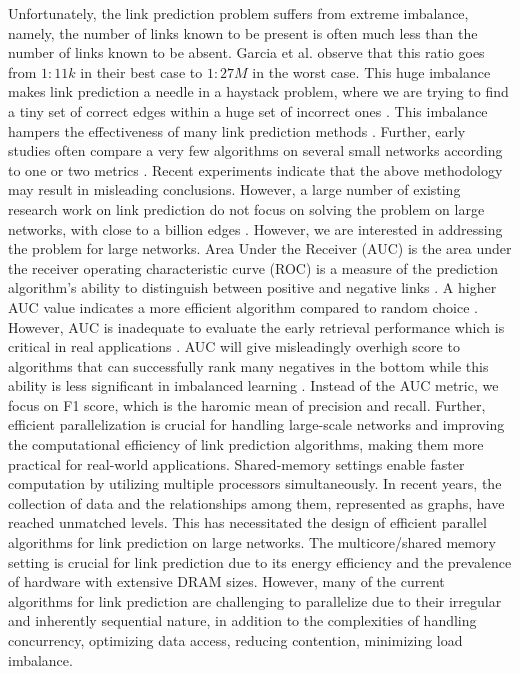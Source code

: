 Unfortunately, the link prediction problem suffers from extreme imbalance, namely, the number of links known to be present is often much less than the number of links known to be absent. Garcia et al. \cite{garcia2014link} observe that this ratio goes from $1 : 11k$ in their best case to $1 : 27M$ in the worst case. This huge imbalance makes link prediction a needle in a haystack problem, where we are trying to find a tiny set of correct edges within a huge set of incorrect ones \cite{garcia2014link, wang2014link}. This imbalance hampers the effectiveness of many link prediction methods \cite{wang2014link}. Further, early studies often compare a very few algorithms on several small networks according to one or two metrics \cite{zhou2021progresses}. Recent experiments \cite{mara2020benchmarking, ghasemian2020stacking, muscoloni2022adaptive, zhou2021experimental} indicate that the above methodology may result in misleading conclusions. However, a large number of existing research work on link prediction do not focus on solving the problem on large networks, with close to a billion edges \cite{muscoloni2022adaptive, mumin2022efficient, nasiri2021novel, xian2021towards, ghasemian2020stacking, mara2020benchmarking, wang2019link, xu2019distributed, mohan2017scalable, cui2016bounded, garcia2014link, papadimitriou2012fast}. However, we are interested in addressing the problem for large networks. Area Under the Receiver (AUC) \cite{hanley1982meaning} is the area under the receiver operating characteristic curve (ROC) is a measure of the prediction algorithm's ability to distinguish between positive and negative links \cite{arrar2023comprehensive}. A higher AUC value indicates a more efficient algorithm compared to random choice \cite{mumin2022efficient}. However, AUC is inadequate to evaluate the early retrieval performance which is critical in real applications \cite{zhou2021progresses}. AUC will give misleadingly overhigh score to algorithms that can successfully rank many negatives in the bottom while this ability is less significant in imbalanced learning \cite{yang2015evaluating, lichtnwalter2012link}. Instead of the AUC metric, we focus on F1 score, which is the haromic mean of precision and recall. Further, efficient parallelization is crucial for handling large-scale networks and improving the computational efficiency of link prediction algorithms, making them more practical for real-world applications. Shared-memory settings enable faster computation by utilizing multiple processors simultaneously. In recent years, the collection of data and the relationships among them, represented as graphs, have reached unmatched levels. This has necessitated the design of efficient parallel algorithms for link prediction on large networks. The multicore/shared memory setting is crucial for link prediction due to its energy efficiency and the prevalence of hardware with extensive DRAM sizes. However, many of the current algorithms for link prediction are challenging to parallelize due to their irregular and inherently sequential nature, in addition to the complexities of handling concurrency, optimizing data access, reducing contention, minimizing load imbalance.

